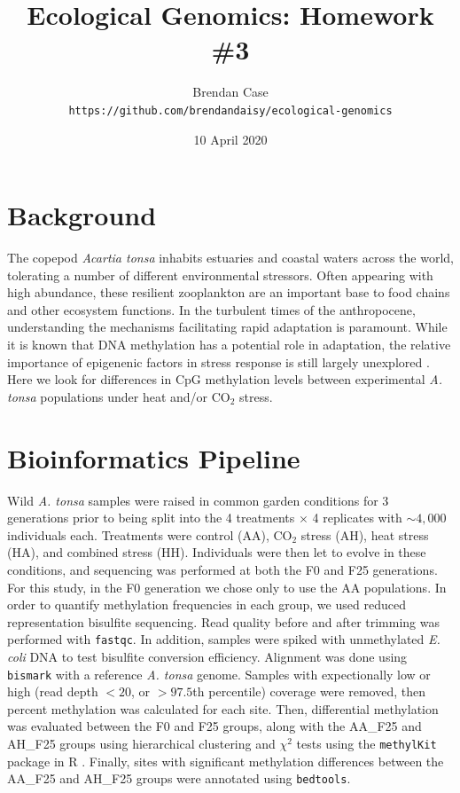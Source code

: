 \documentclass[11pt]{scrartcl}
\title{Ecological Genomics: Homework \#3}
\author{Brendan Case\\
\footnotesize{\texttt{https://github.com/brendandaisy/ecological-genomics}}}
\date{10 April 2020}
\begin{document}
\maketitle

\section{Background}
\label{sec:background}

The copepod \textit{Acartia tonsa} inhabits estuaries and coastal
waters across the world, tolerating a number of different
environmental stressors. Often appearing with high abundance, these
resilient zooplankton are an important base to food chains and other
ecosystem functions.
%
In the turbulent times of the anthropocene, understanding the
mechanisms facilitating rapid adaptation is paramount. While it is
known that DNA methylation has a potential role in adaptation, the
relative importance of epigenenic factors in stress response is still
largely unexplored \cite{Boyko2010, Flores2013}. Here we look for
differences in CpG methylation levels between experimental
\textit{A. tonsa} populations under heat and/or CO$_2$ stress.

\section{Bioinformatics Pipeline}
\label{sec:bioinf-pipel}

Wild \textit{A. tonsa} samples were raised in common garden conditions
for 3 generations prior to being split into the 4 treatments $\times$
4 replicates with $\sim 4,000$ individuals each. Treatments were
control (AA), CO$_2$ stress (AH), heat stress (HA), and combined
stress (HH). Individuals were then let to evolve in these conditions,
and sequencing was performed at both the F0 and F25 generations. For
this study, in the F0 generation we chose only to use the AA
populations. In order to quantify methylation frequencies in each
group, we used reduced representation bisulfite sequencing. Read
quality before and after trimming was performed with
\texttt{fastqc}. In addition, samples were spiked with unmethylated
\textit{E. coli} DNA to test bisulfite conversion
efficiency. Alignment was done using \texttt{bismark} with a reference
\textit{A. tonsa} genome. Samples with expectionally low or high (read
depth $<20$, or $>97.5$th percentile) coverage were removed, then
percent methylation was calculated for each site. Then, differential
methylation was evaluated between the F0 and F25 groups, along with
the AA\_F25 and AH\_F25 groups using hierarchical clustering and
$\chi^2$ tests using the \texttt{methylKit} package in R
\cite{Akalin2012}. Finally, sites with significant methylation
differences between the AA\_F25 and AH\_F25 groups were annotated
using \texttt{bedtools}.
\end{document}
